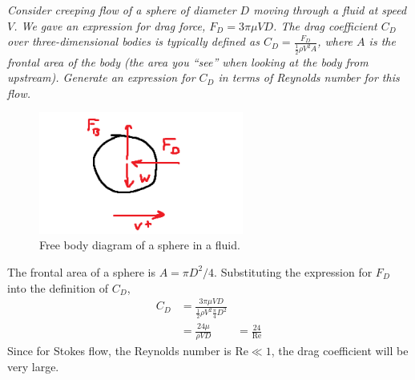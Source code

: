\section{}
\textit{Consider creeping flow of a sphere of diameter $D$ moving through a fluid at speed $V$. We gave an expression for drag force, $F_D = 3\pi\mu VD$. The drag coefficient $C_D$ over three-dimensional bodies is typically defined as $C_D = \frac{F_D}{\frac{1}{2}\rho V^2A}$, where $A$ is the frontal area of the body (the area you “see” when looking at the body from upstream). Generate an expression for $C_D$ in terms of Reynolds number for this flow.}

\begin{figure}[H]
    \centering
    \includegraphics[width=0.6\textwidth]{Questions/Figures/Q3 FBD.png}
    \caption{Free body diagram of a sphere in a fluid.} 
    \label{fig:Q3 FBD}
\end{figure}

The frontal area of a sphere is $A = \pi D^2/4$. Substituting the expression for $F_D$ into the definition of $C_D$,
\begin{align*}
    C_D &= \frac{3\pi\mu VD}{\frac{1}{2}\rho V^2 \frac{\pi}{4} D^2} \\
    &= \frac{24\mu}{\rho VD}
    &= \boxed{\frac{24}{\text{Re}}}
\end{align*}
Since for Stokes flow, the Reynolds number is $\text{Re} \ll 1$, the drag coefficient will be very large.
